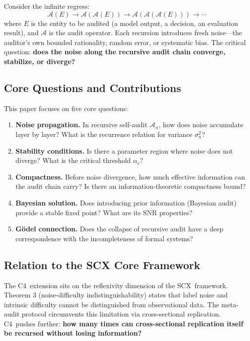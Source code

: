 \documentclass[12pt,a4paper]{article}
\theoremstyle{definition}
\newcommand{\SCX}{\textsf{SCX}}
\newcommand{\Cfour}{\textsc{C4}}
\newcommand{\AuditOp}{\mathcal{A}}
\begin{document}
Consider the infinite regress:
\begin{equation}\label{eq:intro_recursion}
    \AuditOp(E) \to \AuditOp(\AuditOp(E)) \to \AuditOp(\AuditOp(\AuditOp(E))) \to \cdots
\end{equation}
where $E$ is the entity to be audited (a model output, a decision, an evaluation result), and $\AuditOp$ is the audit operator. Each recursion introduces fresh noise---the auditor's own bounded rationality, random error, or systematic bias. The critical question: \textbf{does the noise along the recursive audit chain converge, stabilize, or diverge?}

\subsection{Core Questions and Contributions}

This paper focuses on five core questions:

\begin{enumerate}[label=\textbf{Q\arabic*}, leftmargin=*]
    \item \textbf{Noise propagation.} In recursive self-audit $\AuditOp_n$, how does noise accumulate layer by layer? What is the recurrence relation for variance $\sigma_n^2$?
    \item \textbf{Stability conditions.} Is there a parameter region where noise does not diverge? What is the critical threshold $\alpha_c$?
    \item \textbf{Compactness.} Before noise divergence, how much effective information can the audit chain carry? Is there an information-theoretic compactness bound?
    \item \textbf{Bayesian solution.} Does introducing prior information (Bayesian audit) provide a stable fixed point? What are its SNR properties?
    \item \textbf{G\"{o}del connection.} Does the collapse of recursive audit have a deep correspondence with the incompleteness of formal systems?
\end{enumerate}

\subsection{Relation to the SCX Core Framework}

The \Cfour\ extension sits on the reflexivity dimension of the \SCX\ framework. Theorem 3 (noise-difficulty indistinguishability) states that label noise and intrinsic difficulty cannot be distinguished from observational data. The meta-audit protocol circumvents this limitation via cross-sectional replication. \Cfour\ pushes further: \textbf{how many times can cross-sectional replication itself be recursed without losing information?}
\end{document}
